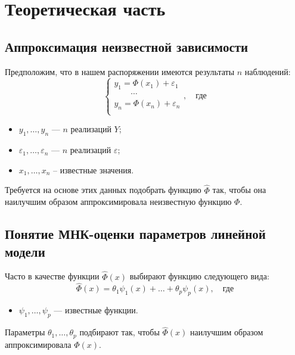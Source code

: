 
\section{Теоретическая часть}

\subsection{Аппроксимация неизвестной зависимости}

Предположим, что в нашем распоряжении имеются результаты $n$ наблюдений:
\begin{equation}
\begin{cases}
    y_1 = \Phi(x_1) + \varepsilon_1 \\
    \qquad\cdots                    \\
    y_n = \Phi(x_n) + \varepsilon_n \\
\end{cases}, \quad \text{где}
\end{equation}
\begin{itemize}
    \item $y_1, \dots, y_n$ --- $n$ реализаций $Y$;
    \item $\varepsilon_1, \dots, \varepsilon_n$ --- $n$ реализаций $\varepsilon$;
    \item $x_1, \dots, x_n$ -- известные значения.
\end{itemize}
Требуется на основе этих данных подобрать функцию $\widehat{\Phi}$ так, чтобы она наилучшим образом аппроксимировала неизвестную функцию $\Phi$.


\subsection{Понятие МНК-оценки параметров линейной модели}

Часто в качестве функции $\widehat{\Phi}(x)$ выбирают функцию следующего вида:
\begin{equation}
    \widehat{\Phi}(x) = \theta_1 \psi_1(x) + \dots + \theta_p \psi_p(x), \quad \text{где}
\end{equation}
\begin{itemize}
    \item $\psi_1, \dots, \psi_p$ --- известные функции.
\end{itemize}
Параметры $\theta_1, \dots, \theta_p$ подбирают так, чтобы $\widehat{\Phi}(x)$ наилучшим образом аппроксимировала $\Phi(x)$.

